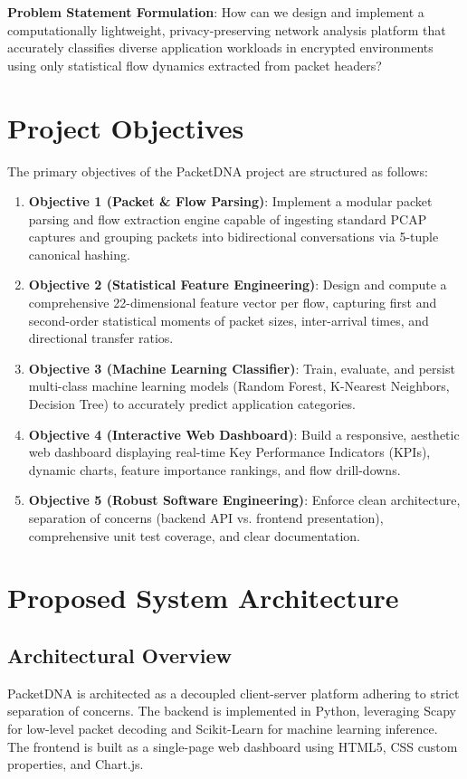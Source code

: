 \documentclass[10pt,journal,compsoc]{IEEEtran}
\begin{document}
\textbf{Problem Statement Formulation}: How can we design and implement a computationally lightweight, privacy-preserving network analysis platform that accurately classifies diverse application workloads in encrypted environments using only statistical flow dynamics extracted from packet headers?

\section{Project Objectives}
The primary objectives of the PacketDNA project are structured as follows:
\begin{enumerate}
    \item \textbf{Objective 1 (Packet \& Flow Parsing)}: Implement a modular packet parsing and flow extraction engine capable of ingesting standard PCAP captures and grouping packets into bidirectional conversations via 5-tuple canonical hashing.
    \item \textbf{Objective 2 (Statistical Feature Engineering)}: Design and compute a comprehensive 22-dimensional feature vector per flow, capturing first and second-order statistical moments of packet sizes, inter-arrival times, and directional transfer ratios.
    \item \textbf{Objective 3 (Machine Learning Classifier)}: Train, evaluate, and persist multi-class machine learning models (Random Forest, K-Nearest Neighbors, Decision Tree) to accurately predict application categories.
    \item \textbf{Objective 4 (Interactive Web Dashboard)}: Build a responsive, aesthetic web dashboard displaying real-time Key Performance Indicators (KPIs), dynamic charts, feature importance rankings, and flow drill-downs.
    \item \textbf{Objective 5 (Robust Software Engineering)}: Enforce clean architecture, separation of concerns (backend API vs. frontend presentation), comprehensive unit test coverage, and clear documentation.
\end{enumerate}

\section{Proposed System Architecture}

\subsection{Architectural Overview}
PacketDNA is architected as a decoupled client-server platform adhering to strict separation of concerns. The backend is implemented in Python, leveraging Scapy for low-level packet decoding and Scikit-Learn for machine learning inference. The frontend is built as a single-page web dashboard using HTML5, CSS custom properties, and Chart.js.
\end{document}
